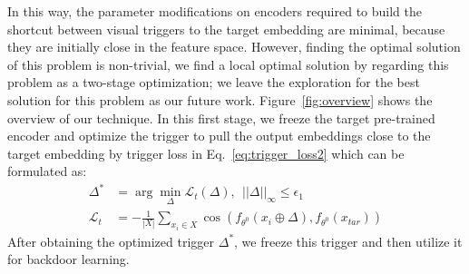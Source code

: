 In this way, the parameter modifications on encoders required to build the shortcut between visual triggers to the target embedding are minimal, because they are initially close in the feature space. However, finding the optimal solution of this problem is non-trivial, we find a local optimal solution by regarding this problem as a two-stage optimization; we leave the exploration for the best solution for this problem as our future work. Figure~\ref{fig:overview} shows the overview of our technique.  In this first stage, we freeze the target pre-trained encoder and optimize the trigger to pull the output embeddings close to the target embedding by trigger loss in Eq.~\ref{eq:trigger_loss2} which can be formulated as:
\begin{align}
    \varDelta^* &= \arg \min_{\varDelta} \mathcal{L}_t\left( \varDelta \right), ~~\left|\left|\varDelta\right|\right|_\infty \leq \epsilon_1 \\
    \mathcal{L}_t &= -\frac{1}{\left| X \right|} \sum_{x_i \in X} \cos\left( f_{\theta^0}\left( x_i \oplus \varDelta \right), f_{\theta^0}\left( x_{tar} \right) \right) \label{eq:stage1_trigger_loss}
\end{align}
After obtaining the optimized trigger $\varDelta^*$, we freeze this trigger and then utilize it for backdoor learning. 
